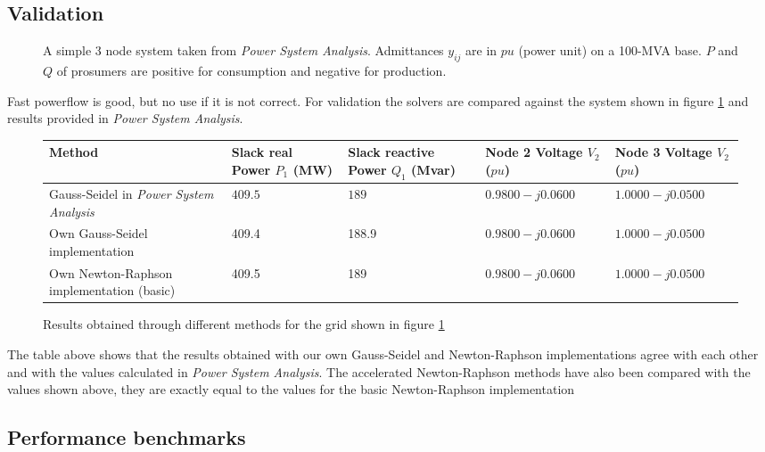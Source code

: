 \subsection{Validation}

\begin{figure}[H]
    \centering
    
    \caption{
        A simple 3 node system taken from \textit{Power System Analysis}\autocite{power_system_analysis}.
        Admittances $y_{ij}$ are in $pu$ (power unit) on a 100-MVA base.
        $P$ and $Q$ of prosumers are positive for consumption and negative for production.
    }
    \label{fig:pf:3_node_system}
\end{figure}


Fast powerflow is good, but no use if it is not correct. For validation
the solvers are compared against the system shown in figure \ref{fig:pf:3_node_system} and results
provided in \textit{Power System Analysis}\autocite{power_system_analysis}.

\begin{figure}[H]
    \begin{center}
        \begin{tabular}{m{3cm} | m{2.5cm} m{2.5cm} m{2.5cm} m{2.5cm}}
            Method & Slack real Power $P_1$ (MW) & Slack reactive Power $Q_1$ (Mvar) & Node 2 Voltage $V_2$ ($pu$) & Node 3 Voltage $V_2$ ($pu$)\\
            \hline
            Gauss-Seidel in \textit{Power System Analysis}\autocite{power_system_analysis} & $409.5$ & $189$ & $0.9800 - j0.0600$ & $1.0000 - j0.0500$\\
            \hline
            Own Gauss-Seidel implementation & 409.4 & 188.9 & $0.9800-j0.0600$ & $1.0000 - j0.0500$ \\
            \hline
            Own Newton-Raphson implementation (basic) & 409.5 & 189 & $0.9800-j0.0600$ & $1.0000 - j0.0500$ \\
        \end{tabular}
    \end{center}
    \caption{Results obtained through different methods for the grid shown in figure \ref{fig:pf:3_node_system}}
\end{figure}

The table above shows that the results obtained with our own Gauss-Seidel and Newton-Raphson
implementations agree with each other and with the values calculated in \textit{Power System Analysis}\autocite{power_system_analysis}. The accelerated
Newton-Raphson methods have also been compared with the values shown above, they are exactly equal to the values 
for the basic Newton-Raphson implementation

\subsection{Performance benchmarks}

